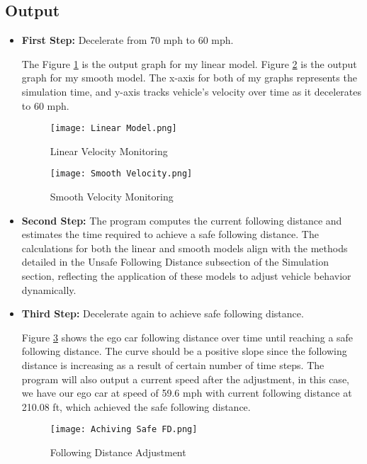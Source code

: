 \documentclass[12pt]{article}
\begin{document}
\subsection*{Output}
\begin{itemize}
    \item \textbf{First Step: } Decelerate from 70 mph to 60 mph. 
    
    The Figure \ref{fig:Linear Velocity Change} is the output graph for my linear model. Figure \ref{fig:Smooth Velocity Change} is the output graph for my smooth model. The x-axis for both of my graphs represents the simulation time, and y-axis tracks vehicle's velocity over time as it decelerates to 60 mph. 
    
    \begin{figure}[h!] 
    \centering
    \texttt{[image: Linear Model.png]} 
    \caption{Linear Velocity Monitoring}
    \label{fig:Linear Velocity Change}
    \end{figure}

    \begin{figure}[h!] 
    \centering
    \texttt{[image: Smooth Velocity.png]}  
    \caption{Smooth Velocity Monitoring}
    \label{fig:Smooth Velocity Change}
    \end{figure}
    
    \item \textbf{Second Step: } The program computes the current following distance and estimates the time required to achieve a safe following distance. The calculations for both the linear and smooth models align with the methods detailed in the Unsafe Following Distance subsection of the Simulation section, reflecting the application of these models to adjust vehicle behavior dynamically.
    \item \textbf{Third Step: } Decelerate again to achieve safe following distance. 
    
    Figure \ref{fig:Achieve Safe D} shows the ego car following distance over time until reaching a safe following distance. The curve should be a positive slope since the following distance is increasing as a result of certain number of time steps. The program will also output a current speed after the adjustment, in this case, we have our ego car at speed of 59.6 mph with current following distance at 210.08 ft, which achieved the safe following distance. 
    
    \begin{figure}[h!]
    \centering
    \texttt{[image: Achiving Safe FD.png]} 
    \caption{Following Distance Adjustment}
    \label{fig:Achieve Safe D}
    \end{figure}
    
\end{itemize}
\end{document}
